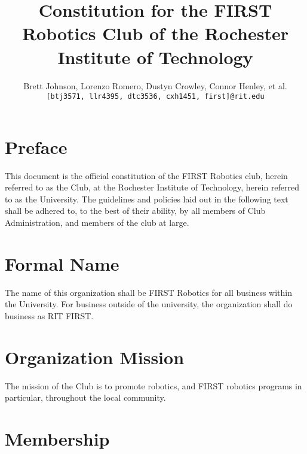 \documentclass[english,11pt]{article}
\renewcommand{\footrulewidth}{1pt} %
\begin{document}
\title{Constitution for the FIRST Robotics Club of the Rochester Institute of Technology}
\author{
    Brett Johnson, Lorenzo Romero, Dustyn Crowley, Connor Henley, et al.  %
    \\    
    \texttt{[btj3571, llr4395, dtc3536, cxh1451, first]@rit.edu}
}
\date{} %

\fancypagestyle{plain}{
    \fancyhf{}
    \renewcommand{\footrulewidth}{0pt} %
}

\maketitle
\newpage %


\section*{Preface}
This document is the official constitution of the FIRST Robotics club, herein referred to as the Club, at the Rochester Institute of Technology, herein referred to as the University.
The guidelines and policies laid out in the following text shall be adhered to, to the best of their ability, by all members of Club Administration, and members of the club at large.

\section{Formal Name}
The name of this organization shall be FIRST Robotics for all business within the University. 
For business outside of the university, the organization shall do business as RIT FIRST.

\section{Organization Mission}
The mission of the Club is to promote robotics, and FIRST robotics programs in particular, throughout the local community.

\section{Membership}
\end{document}
